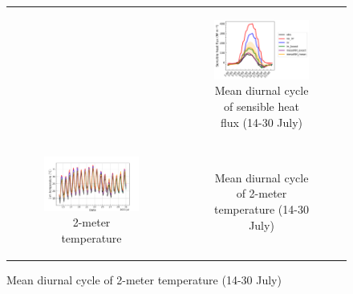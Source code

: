 \begin{figure}[t]
\begin{tabular}{cc}
\begin{subfigure}[t]{0.5\textwidth}
        \end{subfigure} &
        \begin{subfigure}[t]{0.5\textwidth}
            \caption{Mean diurnal cycle of sensible heat flux (14-30 July)}
            \includegraphics[width=\textwidth]{images/chap5/SOP_TS_DC/diurnal_cycle_cendrosa_sens.png}
        \end{subfigure} \\
        \begin{subfigure}[t]{0.5\textwidth}
            \caption{2-meter temperature}
            \includegraphics[width=\textwidth]{images/chap5/SOP_TS_DC/time_series_cendrosa_t2m.png}
        \end{subfigure} &
        \begin{subfigure}[t]{0.5\textwidth}
            \caption{Mean diurnal cycle of 2-meter temperature (14-30 July)}

\end{subfigure}
\end{tabular}
\end{figure}
